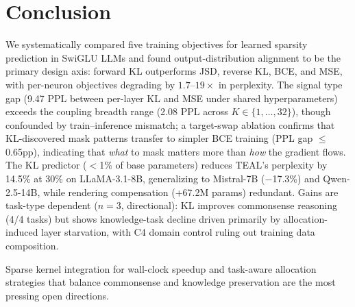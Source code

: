 \section{Conclusion}
\label{sec:conclusion}

We systematically compared five training objectives for learned sparsity prediction in SwiGLU LLMs and found output-distribution alignment to be the primary design axis: forward KL outperforms JSD, reverse KL, BCE, and MSE, with per-neuron objectives degrading by $1.7$--$19\times$ in perplexity.
The signal type gap (9.47 PPL between per-layer KL and MSE under shared hyperparameters) exceeds the coupling breadth range (2.08 PPL across $K \in \{1,\ldots,32\}$), though confounded by train--inference mismatch; a target-swap ablation confirms that KL-discovered mask patterns transfer to simpler BCE training (PPL gap $\leq$0.65pp), indicating that \emph{what} to mask matters more than \emph{how} the gradient flows.
The KL predictor ($<$1\% of base parameters) reduces TEAL's perplexity by 14.5\% at 30\% on LLaMA-3.1-8B, generalizing to Mistral-7B ($-$17.3\%) and Qwen-2.5-14B, while rendering compensation (+67.2M params) redundant.
Gains are task-type dependent ($n{=}3$, directional): KL improves commonsense reasoning (4/4 tasks) but shows knowledge-task decline driven primarily by allocation-induced layer starvation, with C4 domain control ruling out training data composition.

Sparse kernel integration for wall-clock speedup and task-aware allocation strategies that balance commonsense and knowledge preservation are the most pressing open directions.
